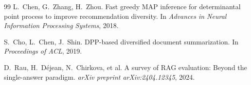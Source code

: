 \documentclass[10pt,a4paper]{article}
\begin{document}
\begin{thebibliography}{99}
L.~Chen, G.~Zhang, H.~Zhou.
\newblock Fast greedy MAP inference for determinantal point process to improve recommendation diversity.
\newblock In \emph{Advances in Neural Information Processing Systems}, 2018.

S.~Cho, L.~Chen, J.~Shin.
\newblock DPP-based diversified document summarization.
\newblock In \emph{Proceedings of ACL}, 2019.

D.~Rau, H.~Déjean, N.~Chirkova, et al.
\newblock A survey of RAG evaluation: Beyond the single-answer paradigm.
\newblock \emph{arXiv preprint arXiv:2404.12345}, 2024.

\end{thebibliography}
\end{document}

